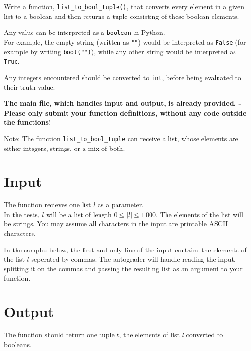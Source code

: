 
Write a function, \texttt{list\_to\_bool\_tuple()},
that converts every element in a given list to a boolean
and then returns a tuple consisting of these boolean elements.

Any value can be interpreted as a \texttt{boolean} in Python.\\
For example, the empty string (written as \texttt{""}) would be interpreted as \texttt{False}
(for example by writing \texttt{bool("")}),
while any other string would be interpreted as \texttt{True}.

Any integers encountered should be converted to \texttt{int},
before being evaluated to their truth value.

\textbf{The main file, which handles input and output, is already provided. -
Please only submit your function definitions, without any code outside the functions!}

Note: The function \texttt{list\_to\_bool\_tuple} can receive a list,
whose elements are either integers, strings, or a mix of both.


\section*{Input}
The function recieves one list $l$ as a parameter.\\
In the tests, $l$ will be a list of length $0 \leq |l| \leq 1\,000$.
The elements of the list will be strings.
You may assume all characters in the input are printable ASCII characters.

In the samples below,
the first and only line of the input contains the elements of the list $l$ seperated by commas.
The autograder will handle reading the input,
splitting it on the commas
and passing the resulting list as an argument to your function.

\section*{Output}
The function should return one tuple $t$,
the elements of list $l$ converted to booleans.
